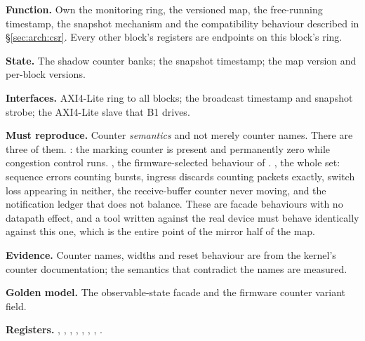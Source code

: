 \textbf{Function.} Own the monitoring ring, the versioned map, the free-running
timestamp, the snapshot mechanism and the compatibility behaviour described in
\S\ref{sec:arch:csr}. Every other block's registers are endpoints on this
block's ring.

\textbf{State.} The shadow counter banks; the snapshot timestamp; the map
version and per-block versions.

\textbf{Interfaces.} AXI4-Lite ring to all blocks; the broadcast timestamp and
snapshot strobe; the AXI4-Lite slave that B1 drives.

\textbf{Must reproduce.} Counter \emph{semantics} and not merely counter
names. There are three of them. : the marking counter
 is present and permanently zero while
congestion control runs. , the firmware-selected behaviour of
. , the whole set: sequence errors
counting bursts, ingress discards counting packets exactly, switch loss
appearing in neither, the receive-buffer counter never moving, and the
notification ledger that does not balance. These are facade behaviours with no
datapath effect, and a tool written against the real device must behave
identically against this one, which is the entire point of the mirror half of
the map.

\textbf{Evidence.} Counter names, widths and reset behaviour are \evdoc{} from
the kernel's counter documentation; the semantics that contradict the names are
measured.

\textbf{Golden model.} The observable-state facade and the firmware counter
variant field.

{\raggedright
\textbf{Registers.} , ,
, , ,
, , .
\par}